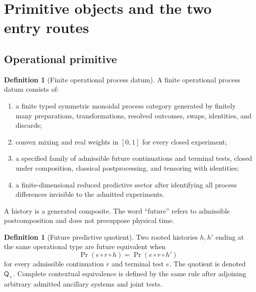 \documentclass[11pt]{article}
\theoremstyle{definition}
\newtheorem{definition}[theorem]{Definition}
\theoremstyle{remark}
\newcommand{\Qq}{\mathsf Q}
\begin{document}
\section{Primitive objects and the two entry routes}

\subsection{Operational primitive}

\begin{definition}[Finite operational process datum]
A finite operational process datum consists of:
\begin{enumerate}[label=\textup{(\roman*)},leftmargin=2.6em]
\item a finite typed symmetric monoidal process category generated by finitely
      many preparations, transformations, resolved outcomes, swaps, identities,
      and discards;
\item convex mixing and real weights in $[0,1]$ for every closed experiment;
\item a specified family of admissible future continuations and terminal tests,
      closed under composition, classical postprocessing, and tensoring with
      identities;
\item a finite-dimensional reduced predictive sector after identifying all
      process differences invisible to the admitted experiments.
\end{enumerate}
A history is a generated composite.  The word ``future'' refers to admissible
postcomposition and does not presuppose physical time.
\end{definition}

\begin{definition}[Future predictive quotient]
Two rooted histories $h,h'$ ending at the same operational type are future
equivalent when
\[
  \Pr(e\circ r\circ h)=\Pr(e\circ r\circ h')
\]
for every admissible continuation $r$ and terminal test $e$.  The quotient is
denoted $\Qq_+$.  Complete contextual equivalence is defined by the same rule
after adjoining arbitrary admitted ancillary systems and joint tests.
\end{definition}
\end{document}

